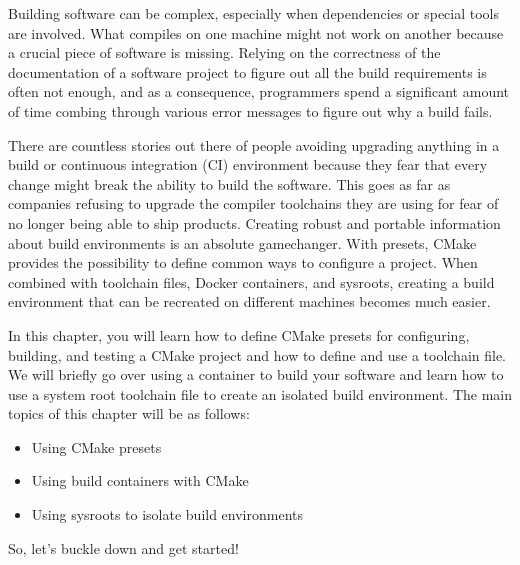 Building software can be complex, especially when dependencies or special tools are involved. What compiles on one machine might not work on another because a crucial piece of software is missing. Relying on the correctness of the documentation of a software project to figure out all the build requirements is often not enough, and as a consequence,  programmers spend a significant amount of time combing through various error messages to figure out why a build fails.

There are countless stories out there of people avoiding upgrading anything in a build or continuous integration (CI) environment because they fear that every change might break the ability to build the software. This goes as far as companies refusing to upgrade the compiler toolchains they are using for fear of no longer being able to ship products. Creating robust and portable information about build environments is an absolute gamechanger. With presets, CMake provides the possibility to define common ways to configure a project. When combined with toolchain files, Docker containers, and sysroots, creating a build environment that can be recreated on different machines becomes much easier.

In this chapter, you will learn how to define CMake presets for configuring, building, and testing a CMake project and how to define and use a toolchain file. We will briefly go over using a container to build your software and learn how to use a system root toolchain file to create an isolated build environment. The main topics of this chapter will be as follows:

\begin{itemize}
\item 
Using CMake presets

\item 
Using build containers with CMake

\item 
Using sysroots to isolate build environments
\end{itemize}

So, let's buckle down and get started!





































